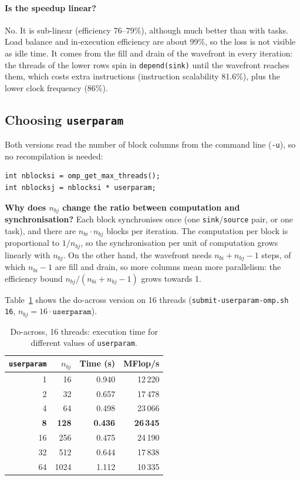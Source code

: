 \documentclass[11pt,a4paper]{article}
\begin{document}
\paragraph{Is the speedup linear?} No. It is sub-linear (efficiency 76--79\%), although much better than with tasks. Load balance and in-execution efficiency are about 99\%, so the loss is not visible as idle time. It comes from the fill and drain of the wavefront in every iteration: the threads of the lower rows spin in \texttt{depend(sink)} until the wavefront reaches them, which costs extra instructions (instruction scalability 81.6\%), plus the lower clock frequency (86\%).

\subsection{Choosing \texttt{userparam}}

Both versions read the number of block columns from the command line (\texttt{-u}), so no recompilation is needed:
\begin{lstlisting}
int nblocksi = omp_get_max_threads();
int nblocksj = nblocksi * userparam;
\end{lstlisting}

\textbf{Why does $n_{bj}$ change the ratio between computation and synchronisation?} Each block synchronises once (one \texttt{sink}/\texttt{source} pair, or one task), and there are $n_{bi}\cdot n_{bj}$ blocks per iteration. The computation per block is proportional to $1/n_{bj}$, so the synchronisation per unit of computation grows linearly with $n_{bj}$. On the other hand, the wavefront needs $n_{bi}+n_{bj}-1$ steps, of which $n_{bi}-1$ are fill and drain, so more columns mean more parallelism: the efficiency bound $n_{bj}/(n_{bi}+n_{bj}-1)$ grows towards 1.

Table~\ref{tab:userparam} shows the do-across version on 16 threads (\texttt{submit-userparam-omp.sh 16}, $n_{bj} = 16\cdot\texttt{userparam}$).

\begin{table}[H]
\centering
\begin{tabular}{rrrr}
\toprule
\texttt{userparam} & $n_{bj}$ & Time (s) & MFlop/s \\
\midrule
1  & 16   & 0.940 & 12\,220 \\
2  & 32   & 0.657 & 17\,478 \\
4  & 64   & 0.498 & 23\,066 \\
\textbf{8} & \textbf{128} & \textbf{0.436} & \textbf{26\,345} \\
16 & 256  & 0.475 & 24\,190 \\
32 & 512  & 0.644 & 17\,838 \\
64 & 1024 & 1.112 & 10\,335 \\
\bottomrule
\end{tabular}
\caption{Do-across, 16 threads: execution time for different values of \texttt{userparam}.}
\label{tab:userparam}
\end{table}
\end{document}
